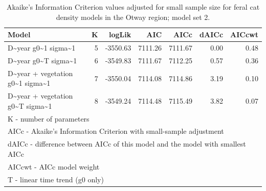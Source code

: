 \documentclass[11pt,a4paper,titlepage,twoside,openright]{style/unimelbthesis}
\begin{document}
\begin{mainmatter}
\begingroup\fontsize{10}{12}\selectfont
\begin{longtable}[t]{lrrrrrr}
\caption{\label{tab:density-aic-o-2}Akaike's Information Criterion values adjusted for small sample size for feral cat density models in the Otway region; model set 2.}\\
\toprule
Model & K & logLik & AIC & AICc & dAICc & AICcwt\\
\midrule
D\textasciitilde{}year g0\textasciitilde{}1 sigma\textasciitilde{}1 & 5 & -3550.63 & 7111.26 & 7111.67 & 0.00 & 0.48\\
D\textasciitilde{}year g0\textasciitilde{}T sigma\textasciitilde{}1 & 6 & -3549.83 & 7111.67 & 7112.25 & 0.57 & 0.36\\
D\textasciitilde{}year + vegetation g0\textasciitilde{}1 sigma\textasciitilde{}1 & 7 & -3550.04 & 7114.08 & 7114.86 & 3.19 & 0.10\\
D\textasciitilde{}year + vegetation g0\textasciitilde{}T sigma\textasciitilde{}1 & 8 & -3549.24 & 7114.48 & 7115.49 & 3.82 & 0.07\\
\bottomrule
\multicolumn{7}{l}{\rule{0pt}{1em}K - number of parameters}\\
\multicolumn{7}{l}{\rule{0pt}{1em}AICc - Akaike's Information Criterion with small-sample adjustment}\\
\multicolumn{7}{l}{\rule{0pt}{1em}dAICc - difference between AICc of this model and the model with smallest AICc}\\
\multicolumn{7}{l}{\rule{0pt}{1em}AICcwt - AICc model weight}\\
\multicolumn{7}{l}{\rule{0pt}{1em}T - linear time trend (g0 only)}\\
\end{longtable}
\endgroup{}

\newpage

\(~\)

\(~\)

\(~\)


\end{mainmatter}
\end{document}
